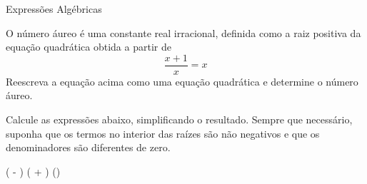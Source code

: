 
\begin{exercicios}{Expressões Algébricas}
    
    
    
    
               
    \begin{exercicio}
        O número áureo é uma constante real irracional, definida como a raiz positiva da equação quadrática obtida a partir de
        \[ \frac{x + 1}{x} = x \]
        Reescreva a equação acima como uma equação quadrática e determine o número áureo.
    \end{exercicio}

    \begin{exercicio}
        Calcule as expressões abaixo, simplificando o resultado. Sempre que necessário, 
	suponha que os termos no interior das raízes são não negativos e que os denominadores 
	são diferentes de zero.
            \begin{mathlist}
                \item {}
                \item \left( - \right) \left( + \right) \left(\right)
                \item {}
                \item {}
                \item {}
                \item {}
                \item {}
                \item {}
            \end{mathlist}     
    \end{exercicio}
                        

\end{exercicios}
